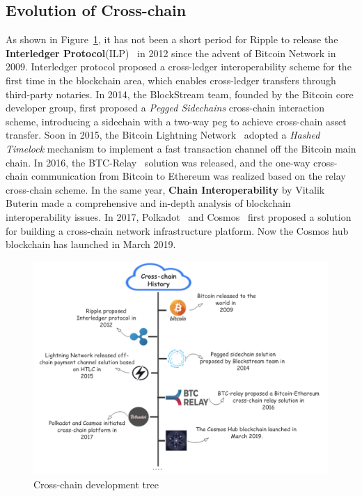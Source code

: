 \subsection{Evolution of Cross-chain}
\noindent As shown in Figure~\ref{fig:his}, it has not been a short period for Ripple to release the \textbf{Interledger Protocol}(ILP)~\cite{thomas2015protocol} in 2012 since the advent of Bitcoin Network in 2009. Interledger protocol proposed a cross-ledger interoperability scheme for the first time in the blockchain area, which enables cross-ledger transfers through third-party notaries. In 2014, the BlockStream team, founded by the Bitcoin core developer group, first proposed a \textit{Pegged Sidechains} cross-chain interaction scheme, introducing a sidechain with a two-way peg to achieve cross-chain asset transfer. Soon in 2015, the Bitcoin Lightning Network~\cite{poon2016bitcoin} adopted a \textit{Hashed Timelock} mechanism to implement a fast transaction channel off the Bitcoin main chain. In 2016, the BTC-Relay~\cite{btc-relay} solution was released, and the one-way cross-chain communication from Bitcoin to Ethereum was realized based on the relay cross-chain scheme. In the same year, \textbf{Chain Interoperability}\cite{buterin2016chain} by Vitalik Buterin made a comprehensive and in-depth analysis of blockchain interoperability issues. In 2017, Polkadot~\cite{polkadot} and Cosmos~\cite{cosmos} first proposed a solution for building a cross-chain network infrastructure platform. Now the Cosmos hub blockchain has launched in March 2019.

    \begin{figure}[H]
    \includegraphics[width=1\textwidth]{./figures/his.png}
    \centering
    \caption{Cross-chain development tree}%
    \centering
    \label{fig:his}
    \end{figure}
    

